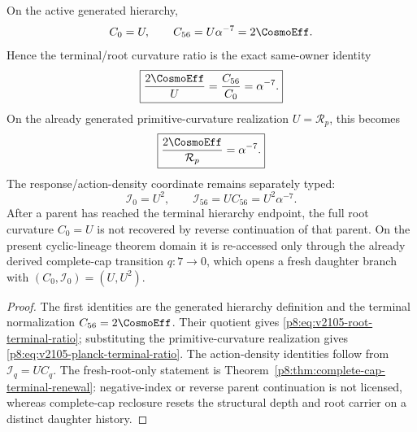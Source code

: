 \documentclass[12pt,a4paper]{article}
\begin{document}
\begin{theorem}
\label{p8:thm:v2105-root-terminal-hierarchy}
On the active generated hierarchy,
\[
 C_0=U,\qquad C_{56}=U\alpha^{-7}=2\CosmoEff.
\]
Hence the terminal/root curvature ratio is the exact same-owner identity
\begin{equation}
\label{p8:eq:v2105-root-terminal-ratio}
 \boxed{\frac{2\CosmoEff}{U}=\frac{C_{56}}{C_0}=\alpha^{-7}.}
\end{equation}
On the already generated primitive-curvature realization
\(U=\mathcal R_p\), this becomes
\begin{equation}
\label{p8:eq:v2105-planck-terminal-ratio}
 \boxed{\frac{2\CosmoEff}{\mathcal R_p}=\alpha^{-7}.}
\end{equation}
The response/action-density coordinate remains separately typed:
\[
 \mathcal I_0=U^2,
 \qquad
 \mathcal I_{56}=UC_{56}=U^2\alpha^{-7}.
\]
After a parent has reached the terminal hierarchy endpoint, the full root
curvature \(C_0=U\) is not recovered by reverse continuation of that parent.
On the present cyclic-lineage theorem domain it is re-accessed only through
the already derived complete-cap transition \(q:7\to0\), which opens a fresh
daughter branch with \((C_0,\mathcal I_0)=(U,U^2)\).
\end{theorem}

\begin{proof}
The first identities are the generated hierarchy definition and the terminal
normalization \(C_{56}=2\CosmoEff\).  Their quotient gives
\eqref{p8:eq:v2105-root-terminal-ratio}; substituting the primitive-curvature
realization gives \eqref{p8:eq:v2105-planck-terminal-ratio}.  The action-density
identities follow from \(\mathcal I_q=UC_q\).  The fresh-root-only statement is
Theorem~\ref{p8:thm:complete-cap-terminal-renewal}: negative-index or reverse
parent continuation is not licensed, whereas complete-cap reclosure resets
the structural depth and root carrier on a distinct daughter history.
\end{proof}
\end{document}
